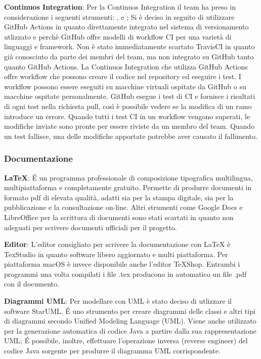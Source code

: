 \begin{description}
\item{\textbf{Continuos Integration}}:  Per la Continuos Integration il team ha preso in considerazione i seguenti strumenti: ,  e ;
Si è deciso in seguito di utilizzare GitHub Actions in quanto direttamente integrato nel sistema di versionamento utlizzato e perchè 
GitHub offre modelli di workflow CI per una varietà di linguaggi e framework.
Non è stato immediatamente scartato TravisCI in quanto già conosciuto da parte dei membri del team, ma non integrato su GitHub tanto quanto GitHub Actions.
La Continuos Integration che utilizza GitHub Actions offre workflow che possono creare il codice nel repository ed eseguire i test. 
I workflow possono essere eseguiti su macchine virtuali ospitate da GitHub o su macchine ospitate personalmente.
GitHub esegue i test di CI e fornisce i risultati di ogni test nella richiesta pull, così è possibile vedere se la modifica di un ramo introduce un errore. 
Quando tutti i test CI in un workflow vengono superati, le modifiche inviate sono pronte per essere riviste da un membro del team. 
Quando un test fallisce, una delle modifiche apportate potrebbe aver causato il fallimento. 

\end{description}

\subsubsection{Documentazione} 
\begin{description}
\item{\textbf{\LaTeX}}: \'E un programma professionale di composizione tipografica multilingua,
multipiattaforma e completamente gratuito. Permette di produrre documenti in formato pdf di elevata qualità, adatti sia per la stampa digitale, sia
per la pubblicazione e la consultazione on-line. 
Altri strumenti come Google Docs e LibreOffice per la scrittura di documenti sono stati scartati in quanto non adeguati per scrivere documenti ufficiali per il progetto.

\item{\textbf{Editor}}: L’editor  consigliato  per  scrivere  la  documentazione  con  {\LaTeX}  è TexStudio  in  quanto  software  libero  aggiornato  e  multi  piattaforma. Per piattaforma macOS è invece disponibile
anche l'editor TeXShop. Entrambi i programmi una volta compilati i file .tex producono in automatico un file .pdf con il documento.

\item{\textbf{Diagrammi UML}}: Per modellare con UML è stato deciso di utlizzare il software StarUML. \'E uno strumento per creare diagrammi delle classi e altri tipi di diagrammi secondo Unified Modeling Language (UML). 
Viene anche utilizzato per la generazione automatica di codice Java a partire dalla sua rappresentazione UML; \'E possibile, inoltre, effettuare l’operazione inversa (reverse engineer) del codice Java sorgente per produrre il diagramma UML corrispondente. 
\end{description}

